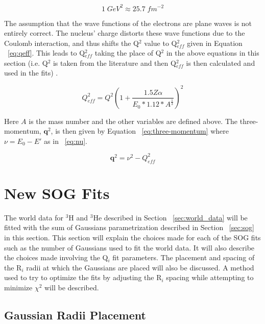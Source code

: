 \begin{equation} \label{eq:gev2fm}
	1 \; GeV^2 \approx 25.7 \; fm^{-2}
\end{equation}

The assumption that the wave functions of the electrons are plane waves is not entirely correct. The nucleus' charge distorts these wave functions due to the Coulomb interaction, and thus shifts the Q$^2$ value to Q$^2_{eff}$ given in Equation ~\ref{eq:qeff}. This leads to Q$^2_{eff}$ taking the place of Q$^2$ in the above equations in this section (i.e. Q$^2$ is taken from the literature and then Q$^2_{eff}$ is then calculated and used in the fits) \cite{Article:Alex}.

\begin{equation} \label{eq:qeff}
	Q^2_{eff} = Q^2 \left(  1+ \frac{1.5Z\alpha}{E_0*1.12*A^{\frac{1}{3}}}   \right)^2
\end{equation}

\noindent Here $A$ is the mass number and the other variables are defined above. The three-momentum, $\boldsymbol{q}^2$, is then given by Equation ~\ref{eq:three-momentum} where $\nu=E_0-E'$ as in ~\ref{eq:nu}.

\begin{equation} \label{eq:three-momentum}
	\boldsymbol{q}^2 = \nu^2 - Q^2_{eff}
\end{equation}

\section{New SOG Fits}
\label{sec:new_fits}

The world data for $^3$H and $^3$He described in Section ~\ref{sec:world_data} will be fitted with the sum of Gaussians parametrization described in Section ~\ref{sec:sog} in this section. This section will explain the choices made for each of the SOG fits such as the number of Gaussians used to fit the world data. It will also describe the choices made involving the Q$_i$ fit parameters. The placement and spacing of the R$_i$ radii at which the Gaussians are placed will also be discussed. A method used to try to optimize the fits by adjusting the R$_i$ spacing while attempting to minimize $\chi^2$ will be described. 

\subsection{Gaussian Radii Placement}
\label{ssec:radii}

